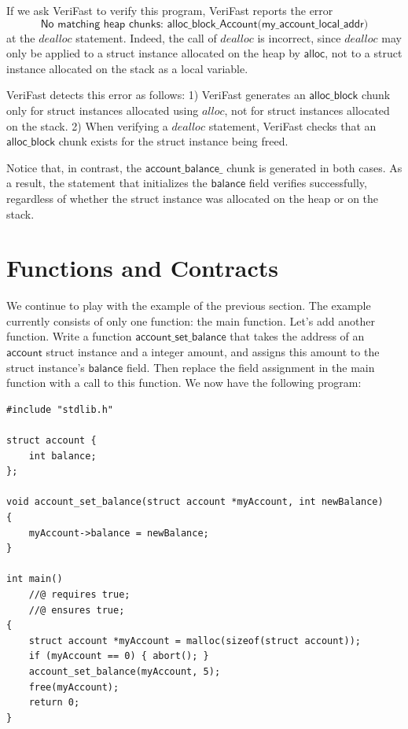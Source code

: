 \documentclass{article}
\begin{document}
If we ask VeriFast to verify this program, VeriFast reports the
error $$\textsf{No matching heap chunks:
alloc\_block\_Account(my\_account\_local\_addr)}$$ at the
$\mathit{dealloc}$ statement. Indeed, the call of $\mathit{dealloc}$ is incorrect,
since $\mathit{dealloc}$ may only be applied to a struct instance
allocated on the heap by $\mathsf{alloc}$, not to a struct
instance allocated on the stack as a local variable.

VeriFast detects this error as follows: 1) VeriFast generates an
$\mathsf{alloc\_block}$ chunk only for struct instances
allocated using $\mathit{alloc}$, not for struct instances
allocated on the stack. 2) When verifying a $\mathit{dealloc}$
statement, VeriFast checks that an $\mathsf{alloc\_block}$
chunk exists for the struct instance being freed.

Notice that, in contrast, the $\mathsf{account\_balance\_}$ chunk
is generated in both cases. As a result, the statement that
initializes the $\mathsf{balance}$ field verifies successfully,
regardless of whether the struct instance was allocated on the
heap or on the stack.

\section{Functions and Contracts}\label{section:functions}

We continue to play with the example of the previous section.
The example currently consists of only one function: the main
function. Let's add another function. Write a function
$\mathsf{account\_set\_balance}$ that takes the address of an
$\mathsf{account}$ struct instance and a integer amount, and
assigns this amount to the struct instance's $\mathsf{balance}$
field. Then replace the field assignment in the main function
with a call to this function. We now have the following
program:

\begin{lstlisting}
#include "stdlib.h"

struct account {
    int balance;
};

void account_set_balance(struct account *myAccount, int newBalance)
{
    myAccount->balance = newBalance;
}

int main()
    //@ requires true;
    //@ ensures true;
{
    struct account *myAccount = malloc(sizeof(struct account));
    if (myAccount == 0) { abort(); }
    account_set_balance(myAccount, 5);
    free(myAccount);
    return 0;
}
\end{lstlisting}
\end{document}
